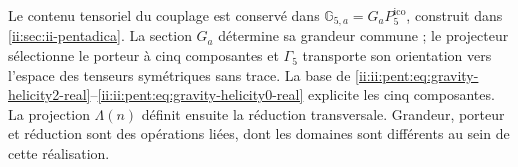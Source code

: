 Le contenu tensoriel du couplage est conservé dans
\(\mathbb G_{5,a}=G_aP^{\mathrm{ico}}_5\), construit dans
\ref{ii:sec:ii-pentadica}. La section \(G_a\) détermine sa grandeur commune ;
le projecteur sélectionne le porteur à cinq composantes et \(\Gamma_5\)
transporte son orientation vers l'espace des tenseurs symétriques sans trace.
La base de \eqref{ii:ii:pent:eq:gravity-helicity2-real}--\eqref{ii:ii:pent:eq:gravity-helicity0-real}
explicite les cinq composantes. La projection \(\Lambda(n)\) définit
ensuite la réduction transversale. Grandeur, porteur et réduction sont des
opérations liées, dont les domaines sont différents au sein de cette réalisation.
